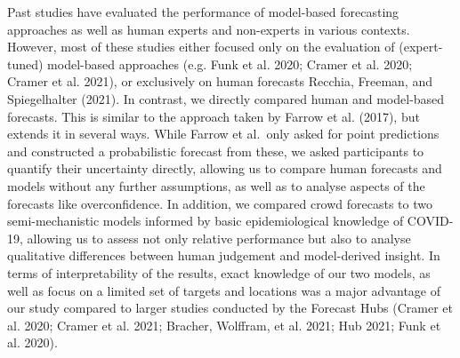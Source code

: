 \documentclass[
]{article}
\begin{document}
Past studies have evaluated the performance of model-based forecasting approaches as well as human experts and non-experts in various contexts. However, most of these studies either focused only on the evaluation of (expert-tuned) model-based approaches (e.g. Funk et al. 2020; Cramer et al. 2020; Cramer et al. 2021), or exclusively on human forecasts Recchia, Freeman, and Spiegelhalter (2021). In contrast, we directly compared human and model-based forecasts. This is similar to the approach taken by Farrow et al. (2017), but extends it in several ways. While Farrow et al.~only asked for point predictions and constructed a probabilistic forecast from these, we asked participants to quantify their uncertainty directly, allowing us to compare human forecasts and models without any further assumptions, as well as to analyse aspects of the forecasts like overconfidence. In addition, we compared crowd forecasts to two semi-mechanistic models informed by basic epidemiological knowledge of COVID-19, allowing us to assess not only relative performance but also to analyse qualitative differences between human judgement and model-derived insight. In terms of interpretability of the results, exact knowledge of our two models, as well as focus on a limited set of targets and locations was a major advantage of our study compared to larger studies conducted by the Forecast Hubs (Cramer et al. 2020; Cramer et al. 2021; Bracher, Wolffram, et al. 2021; Hub 2021; Funk et al. 2020).
\end{document}
